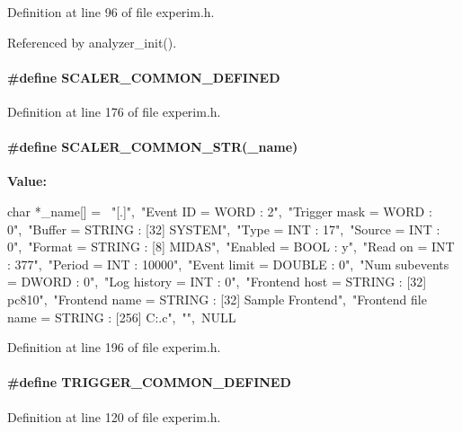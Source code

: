Definition at line 96 of file experim.h.

Referenced by analyzer\_\-init().
\paragraph[{SCALER\_\-COMMON\_\-DEFINED}]{\setlength{\rightskip}{0pt plus 5cm}\#define SCALER\_\-COMMON\_\-DEFINED}\hfill\label{experim_8h_ad1a222c59c26edabcd363cf10bf57eb3}


Definition at line 176 of file experim.h.
\paragraph[{SCALER\_\-COMMON\_\-STR}]{\setlength{\rightskip}{0pt plus 5cm}\#define SCALER\_\-COMMON\_\-STR(\_\-name)}\hfill\label{experim_8h_ab86bef23967c3431a65a1bd292253a39}
{\bfseries Value:}
\begin{DoxyCode}
char *_name[] = {\
"[.]",\
"Event ID = WORD : 2",\
"Trigger mask = WORD : 0",\
"Buffer = STRING : [32] SYSTEM",\
"Type = INT : 17",\
"Source = INT : 0",\
"Format = STRING : [8] MIDAS",\
"Enabled = BOOL : y",\
"Read on = INT : 377",\
"Period = INT : 10000",\
"Event limit = DOUBLE : 0",\
"Num subevents = DWORD : 0",\
"Log history = INT : 0",\
"Frontend host = STRING : [32] pc810",\
"Frontend name = STRING : [32] Sample Frontend",\
"Frontend file name = STRING : [256] C:\Midas\examples\experiment\frontend.c",\
"",\
NULL }
\end{DoxyCode}


Definition at line 196 of file experim.h.
\paragraph[{TRIGGER\_\-COMMON\_\-DEFINED}]{\setlength{\rightskip}{0pt plus 5cm}\#define TRIGGER\_\-COMMON\_\-DEFINED}\hfill\label{experim_8h_a500447a964955e0bffe75b25adee040b}


Definition at line 120 of file experim.h.
